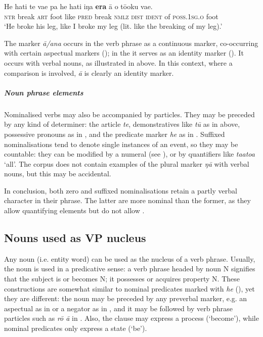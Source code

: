 \ea\label{ex:3.48a}
\gll He hati te va{\ꞌ}e pa he hati iŋa \textbf{era} {\ꞌ}ā o tō{\ꞌ}oku va{\ꞌ}e.\\
\textsc{ntr} break \textsc{art} foot like \textsc{pred} break \textsc{nmlz} \textsc{dist} \textsc{ident} of \textsc{poss.1sg.o} foot\\

\glt
‘He broke his leg, like I broke my leg (lit. like the breaking of my leg).’ \textstyleExampleref{[R492.021]}
\z

The marker \textit{{\ꞌ}ā}\textit{/{\ꞌ}ana} occurs in the verb phrase as a continuous marker, co-occurring with certain aspectual markers (); in the  it serves as an identity marker (). It occurs with verbal nouns, as illustrated in  above. In this context, where a comparison is involved, \textit{{\ꞌ}ā} is clearly an identity marker. 

\subparagraph{Noun phrase elements} Nominalised verbs may also be accompanied by  particles. They may be preceded by any kind of determiner: the article \textit{te}, demonstratives like \textit{tū} as in  above, possessive pronouns as in , and the predicate marker \textit{he} as in . Suffixed nominalisations tend to denote single instances of an event, so they may be countable: they can be modified by a numeral (see ), or by quantifiers like \textit{\mbox{ta{\ꞌ}ato{\ꞌ}a}} ‘all’. The corpus does not contain examples of the plural marker \textit{ŋā} with verbal nouns, but this may be accidental.

In conclusion, both zero and suffixed nominalisations retain a partly verbal character in their phrase. The latter are more nominal than the former, as they allow quantifying elements but do not allow .

\subsection{Nouns used as VP nucleus}\label{sec:3.2.4}
Any noun (i.e. entity word) can be used as the nucleus of a verb phrase. Usually, the noun is used in a predicative sense: a verb phrase headed by noun N signifies that the subject is or becomes N; it possesses or acquires property N. These constructions are somewhat similar to nominal predicates marked with \textit{he} (), yet they are different: the noun may be preceded by any preverbal marker, e.g. an aspectual as in  or a negator as in , and it may be followed by verb phrase particles such as \textit{rō {\ꞌ}ā} in . Also, the clause may express a process (‘become’), while nominal predicates only express a state (‘be’).

